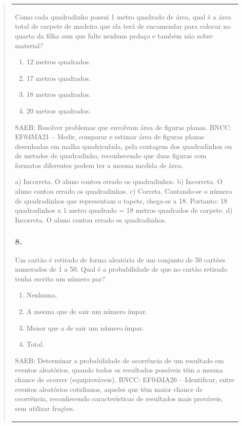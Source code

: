 \begin{mdframed}[linewidth=2pt,linecolor=salmao,roundcorner=2pt]
\begin{itemize}
{\begin{itemize}
\begin{escolha}
{\begin{quote}
{\begin{escolha}
{{{{{\begin{longtable}[]{@{}l@{}}
\begin{itemize}
{Como cada quadradinho possui 1 metro quadrado de área, qual é a área total
de carpete de madeira que ela terá de encomendar para colocar no quarto
da filha sem que falte nenhum pedaço e também não sobre material?

\begin{enumerate}
\item
  12 metros quadrados.
\item
  17 metros quadrados.
\item
  18 metros quadrados.
\item
  20 metros quadrados.
\end{enumerate}

SAEB: Resolver problemas que envolvam área de figuras planas.
BNCC: EF04MA21 -- Medir, comparar e estimar área de figuras planas desenhadas em malha quadriculada,
pela contagem dos quadradinhos ou de metades de quadradinho, reconhecendo que duas figuras
com formatos diferentes podem ter a mesma medida de área.

a) Incorreta. O aluno contou errado os quadradinhos.
b) Incorreta. O aluno contou errado os quadradinhos.
c) Correta. Contando-se o número de quadradinhos que representam o tapete, chega-se a 18. Portanto: 18 quadradinhos x 1 metro quadrado = 18 metros quadrados de carpete.
d) Incorreta. O aluno contou errado os quadradinhos.

\subsubsection{8. }

Um cartão é retirado de forma aleatória de um conjunto de 50 cartões
numerados de 1 a 50. Qual é a probabilidade de que no cartão retirado
tenha escrito um número par?

\begin{enumerate}
\item
  Nenhuma.
\item
  A mesma que de sair um número ímpar.
\item
  Menor que a de sair um número ímpar.
\item
  Total.
\end{enumerate}

SAEB: Determinar a probabilidade de ocorrência de um
resultado em eventos aleatórios, quando todos os resultados possíveis
têm a mesma chance de ocorrer (equiprováveis).
BNCC: EF04MA26 -- Identificar, entre eventos aleatórios cotidianos, aqueles que têm maior chance de
ocorrência, reconhecendo características de resultados mais prováveis, sem utilizar frações.

}
\end{itemize}
\end{longtable}}}}}}
\end{escolha}}
\end{quote}}
\end{escolha}
\end{itemize}}
\end{itemize}
\end{mdframed}
